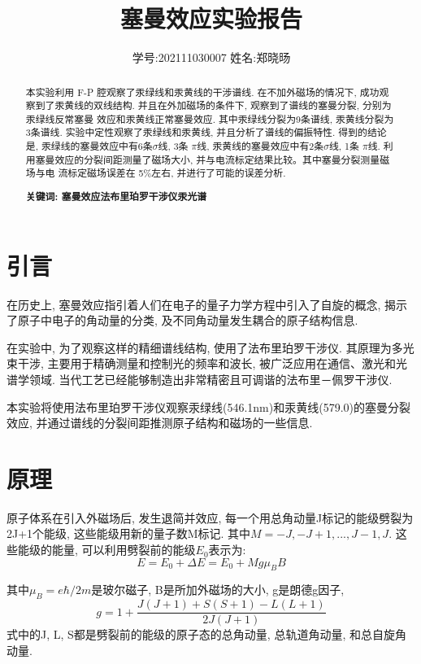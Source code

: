 \documentclass[12pt,a4paper]{article}
\title{\vspace{-4cm}\Large 塞曼效应实验报告}  %
\author{\kaishu 学号:202111030007 \hspace{2cm} 姓名:郑晓旸}   %
\date{}
\begin{document}
\maketitle

\begin{abstract}
本实验利用 F-P 腔观察了汞绿线和汞黄线的干涉谱线. 在不加外磁场的情况下, 成功观察到了汞黄线的双线结构. 
并且在外加磁场的条件下, 观察到了谱线的塞曼分裂, 分别为汞绿线反常塞曼
效应和汞黄线正常塞曼效应. 其中汞绿线分裂为9条谱线, 汞黄线分裂为3条谱线. 
实验中定性观察了汞绿线和汞黄线, 并且分析了谱线的偏振特性. 得到的结论是, 汞绿线的塞曼效应中有6条$\sigma$线, 3条
$\pi$线, 汞黄线的塞曼效应中有2条$\sigma$线, 1条
$\pi$线. 利用塞曼效应的分裂间距测量了磁场大小, 并与电流标定结果比较。其中塞曼分裂测量磁场与电
流标定磁场误差在 5\%左右, 并进行了可能的误差分析. 


\bf{关键词: 塞曼效应\quad 法布里珀罗干涉仪\quad 汞光谱}
\end{abstract}

\section{引言}

在历史上, 塞曼效应指引着人们在电子的量子力学方程中引入了自旋的概念, 揭示了原子中电子的角动量的分类, 及不同角动量发生耦合的原子结构信息. 

在实验中, 为了观察这样的精细谱线结构, 使用了法布里珀罗干涉仪. 其原理为多光束干涉, 主要用于精确测量和控制光的频率和波长, 被广泛应用在通信、激光和光谱学领域. 
当代工艺已经能够制造出非常精密且可调谐的法布里－佩罗干涉仪. \cite{lecturenote}

本实验将使用法布里珀罗干涉仪观察汞绿线(546.1nm)和汞黄线(579.0)的塞曼分裂效应, 并通过谱线的分裂间距推测原子结构和磁场的一些信息. 


\section{原理}
原子体系在引入外磁场后, 发生退简并效应, 每一个用总角动量J标记的能级劈裂为2J+1个能级, 这些能级用新的量子数M标记. 其中$M=-J,-J+1,...,J-1,J$. 
这些能级的能量, 可以利用劈裂前的能级$E_{0}$表示为: 
\begin{equation}
E=E_{0}+\Delta E=E_{0}+M g \mu_{B} B
\end{equation}

其中$\mu_B=e \hbar /2m$是玻尔磁子, B是所加外磁场的大小, g是朗德g因子, 
\begin{equation}
g=1+\frac{J(J+1)+S(S+1)-L(L+1)}{2J(J+1)}
\end{equation}
式中的J, L, S都是劈裂前的能级的原子态的总角动量, 总轨道角动量, 和总自旋角动量. 
\end{document}
